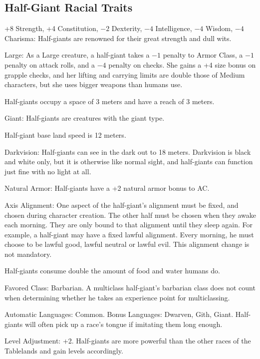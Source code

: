 \subsection{Half-Giant Racial Traits}
\begin{itemize*}
    \item +8 Strength, +4 Constitution, $-2$ Dexterity, $-4$ Intelligence, $-4$ Wisdom, $-4$ Charisma: Half-giants are renowned for their great strength and dull wits.
    \item Large: As a Large creature, a half-giant takes a $-1$ penalty to Armor Class, a $-1$ penalty on attack rolls, and a $-4$ penalty on  checks. She gains a +4 size bonus on grapple checks, and her lifting and carrying limits are double those of Medium characters, but she uses bigger weapons than humans use.
    \item Half-giants occupy a space of 3 meters and have a reach of 3 meters.
    \item Giant: Half-giants are creatures with the giant type.
    \item Half-giant base land speed is 12 meters.
    \item Darkvision: Half-giants can see in the dark out to 18 meters. Darkvision is black and white only, but it is otherwise like normal sight, and half-giants can function just fine with no light at all.
    \item Natural Armor: Half-giants have a +2 natural armor bonus to AC.
    \item Axis Alignment: One aspect of the half-giant's alignment must be fixed, and chosen during character creation. The other half must be chosen when they awake each morning. They are only bound to that alignment until they sleep again. For example, a half-giant may have a fixed lawful alignment. Every morning, he must choose to be lawful good, lawful neutral or lawful evil. This alignment change is not mandatory.
    \item Half-giants consume double the amount of food and water humans do.
    \item Favored Class: Barbarian. A multiclass half-giant's barbarian class does not count when determining whether he takes an experience point for multiclassing.
    \item Automatic Languages: Common. Bonus Languages: Dwarven, Gith, Giant. Half-giants will often pick up a race's tongue if imitating them long enough.
    \item Level Adjustment: +2. Half-giants are more powerful than the other races of the Tablelands and gain levels accordingly.
\end{itemize*}